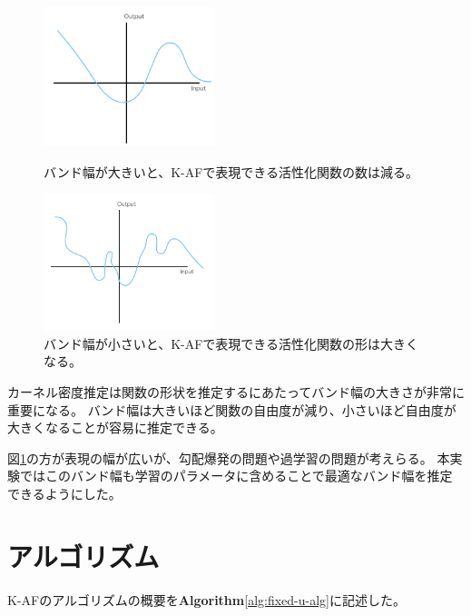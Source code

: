 \begin{figure}[hbtp]
    \begin{center}
            \begin{minipage}{0.40\hsize}
                \includegraphics[width=5cm]{asset/k_af_band_big.png}
                    \caption{バンド幅が大きいと、K-AFで表現できる活性化関数の数は減る。}
                    \label{k_af_band_big}
            \end{minipage}
            \begin{minipage}{0.40\hsize}
            \hspace{10pt}
                \includegraphics[width=5cm]{asset/k_af_band_small.png}
                    \caption{バンド幅が小さいと、K-AFで表現できる活性化関数の形は大きくなる。}
                    \label{k_af_band_small}
            \end{minipage}
    \end{center}
\end{figure}


カーネル密度推定は関数の形状を推定するにあたってバンド幅の大きさが非常に重要になる。
バンド幅は大きいほど関数の自由度が減り、小さいほど自由度が大きくなることが容易に推定できる。

図\ref{k_af_band_small}の方が表現の幅が広いが、勾配爆発の問題や過学習の問題が考えらる。
本実験ではこのバンド幅も学習のパラメータに含めることで最適なバンド幅を推定できるようにした。

\section{アルゴリズム}
\label{al}
K-AFのアルゴリズムの概要を{\bf Algorithm}\ref{alg:fixed-u-alg}に記述した。

